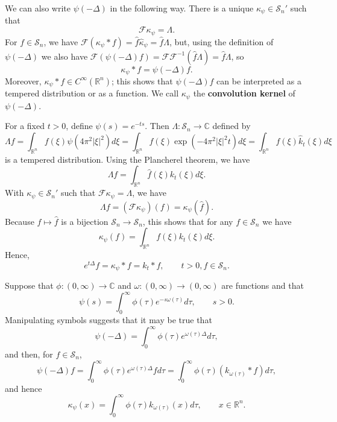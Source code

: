 \documentclass{article}
\begin{document}
We can also write $\psi(-\Delta)$ in the following way. There is a unique $\kappa_\psi \in \mathscr{S}_n'$ such that 
\[
\mathscr{F} \kappa_\psi = \Lambda.
\]
For $f \in \mathscr{S}_n$, we have
$\mathscr{F}(\kappa_\psi*f) = \hat{f} \hat{\kappa}_\psi = \hat{f} \Lambda$,
but, using the definition of $\psi(-\Delta)$ we also have
$\mathscr{F}(\psi(-\Delta) f)=\mathscr{F} \mathscr{F}^{-1}(\hat{f}\Lambda) = \hat{f}\Lambda$,
so
\[
\kappa_\psi*f = \psi(-\Delta) f.
\]
 Moreover, $\kappa_\psi*f \in C^\infty(\mathbb{R}^n)$; this shows that $\psi(-\Delta)f$ can be interpreted as a tempered
distribution or as a function.  We call $\kappa_\psi$ the \textbf{convolution kernel} of $\psi(-\Delta)$. 

For a fixed $t>0$, define $\psi(s)=e^{-ts}$.  Then $\Lambda:\mathscr{S}_n \to \mathbb{C}$ defined by
\[
\Lambda f = \int_{\mathbb{R}^n} f(\xi) \psi(4\pi^2 |\xi|^2) d\xi = \int_{\mathbb{R}^n} f(\xi) \exp\left( -4\pi^2 |\xi|^2 t \right) d\xi = 
\int_{\mathbb{R}^n} f(\xi) \hat{k}_t(\xi)  d\xi
\]
is a tempered distribution. Using the Plancherel theorem, we have
\[
\Lambda f = \int_{\mathbb{R}^n} \hat{f}(\xi) k_t(\xi) d\xi.
\]
With $\kappa_\psi \in \mathscr{S}_n'$ such that $\mathscr{F} \kappa_\psi = \Lambda$, we have
\[
\Lambda f = (\mathscr{F}\kappa_\psi)(f) = \kappa_\psi(\hat{f}).
\]
Because $f \mapsto \hat{f}$ is a bijection $\mathscr{S}_n \to \mathscr{S}_n$, this shows that for any $f \in \mathscr{S}_n$ we have
\[
\kappa_\psi (f) =\int_{\mathbb{R}^n} f(\xi) k_t(\xi) d\xi.
\]
Hence, 
\begin{equation}
e^{t \Delta} f = \kappa_\psi *f= k_t*f, \qquad t>0, f \in \mathscr{S}_n.
\label{heatconv}
\end{equation}

Suppose that $\phi:(0,\infty) \to \mathbb{C}$ and $\omega:(0,\infty) \to (0,\infty)$ are functions and that 
\[
\psi(s) = \int_0^\infty \phi(\tau) e^{-s\omega(\tau)} d\tau, \qquad s>0.
\]
Manipulating symbols suggests that it may be true that
\[
\psi(-\Delta) = \int_0^\infty \phi(\tau) e^{\omega(\tau) \Delta} d\tau,
\]
and then, for $f \in \mathscr{S}_n$,
\[
\psi(-\Delta)f = \int_0^\infty \phi(\tau) e^{\omega(\tau) \Delta} f d\tau =  \int_0^\infty \phi(\tau) (k_{\omega(\tau)} * f )d\tau,
\]
and hence
\begin{equation}
\kappa_\psi(x) = \int_0^\infty \phi(\tau) k_{\omega(\tau)}(x) d\tau, \qquad x \in \mathbb{R}^n.
\label{convkernel}
\end{equation}
\end{document}
